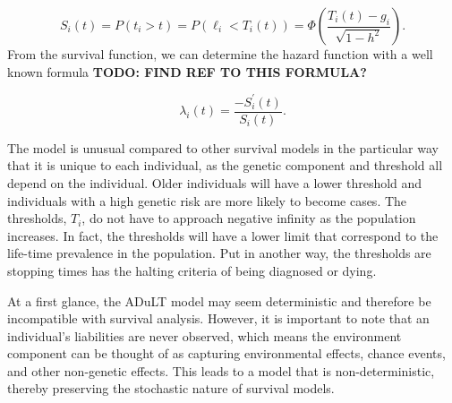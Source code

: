 \begin{equation}
S_i(t) = P(t_i > t) = P\left(\ell_i < T_i(t) \right) = \Phi\left(\dfrac{T_i(t) - g_i}{\sqrt{1 - h^2}}\right).
\end{equation}
From the survival function, we can determine the hazard function with a well known formula \textbf{TODO: FIND REF TO THIS FORMULA?}

\begin{equation}
\lambda_i(t) = \dfrac{-S_i^{'}(t)}{S_i(t)}.
\end{equation}

The model is unusual compared to other survival models in the particular way that it is unique to each individual, as the genetic component and threshold all depend on the individual. Older individuals will have a lower threshold and individuals with a high genetic risk are more likely to become cases. The thresholds, $ T_i $, do not have to approach negative infinity as the population increases. In fact, the thresholds will have a lower limit that correspond to the life-time prevalence in the population. Put in another way, the thresholds are stopping times has the halting criteria of being diagnosed or dying.

At a first glance, the ADuLT model may seem deterministic and therefore be incompatible with survival analysis. However, it is important to note that an individual's liabilities are never observed, which means the environment component can be thought of as capturing environmental effects, chance events, and other non-genetic effects. This leads to a model that is non-deterministic, thereby preserving the stochastic nature of survival models.
